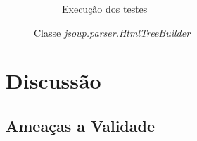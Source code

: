 \begin{figure}[H]
\begin{subfigure}{.5\textwidth}
        \caption{Execução dos testes}
        \label{fig:execJsoupHtmlTreeBuilder}
    \end{subfigure}
    \caption{Classe \textit{jsoup.parser.HtmlTreeBuilder}}
\label{fig:JsoupHtmlTreeBuilder}
\end{figure}

\section{Discussão \label{sec:discussao}}

\subsection{Ameaças a Validade}


